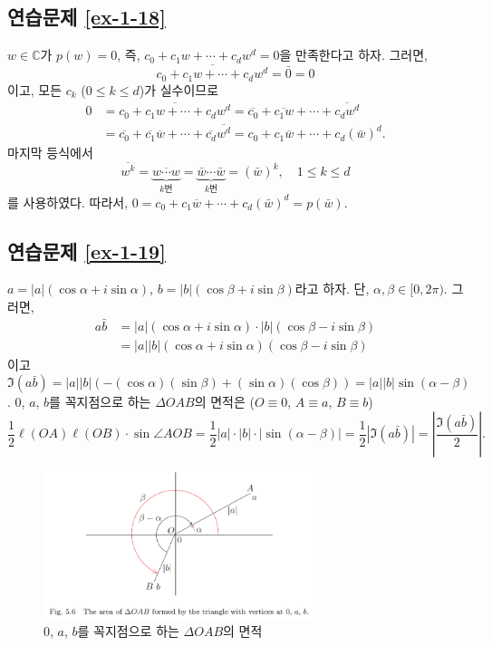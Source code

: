\subsection*{연습문제 \ref{ex-1-18}}

$w\in\mathbb C$가 $p(w)=0$, 즉,
$c_0 + c_1w + \cdots + c_dw^d=0$을 만족한다고 하자. 
그러면,
\[
\overline{c_0 + c_1w + \cdots + c_dw^d} = \bar 0 = 0
\]
이고, 모든 $c_k$ ($0\le k\le d$)가 실수이므로
\begin{align*}
0 & = \overline{c_0 + c_1w + \cdots + c_dw^d} 
= \overline{c_0} + \overline{c_1w} + \cdots + \overline{c_dw^d} \\
&= \overline{c_0} + \overline{c_1}\overline{w} + \cdots + \overline{c_d}\overline{w^d}
= c_0 + c_1\overline{w} + \cdots + c_d(\bar w)^d.
\end{align*}
마지막 등식에서 
\[
\overline{w^k} = \underbrace{\overline{w\cdots w}}_{k\text{번}}
= \underbrace{\bar w \cdots \bar w}_{k\text{번}}
= (\bar w)^k,
\quad 1\le k \le d
\]
를 사용하였다.
따라서, $0=c_0 + c_1\overline{w} + \cdots + c_d(\bar w)^d = p(\bar w)$.

\subsection*{연습문제 \ref{ex-1-19}}

$a = |a|(\cos\alpha + i\sin\alpha)$, 
$b = |b|(\cos\beta + i\sin \beta)$라고 하자.
단, $\alpha, \beta \in [0,2\pi)$. 그러면,
\begin{align*}
a\bar b &= |a|(\cos\alpha + i\sin\alpha)\cdot
|b|(\cos\beta - i\sin \beta) \\
&=|a||b|(\cos\alpha + i\sin\alpha)(\cos\beta - i\sin \beta)
\end{align*}
이고 $\Im(a\bar b) = |a||b|(-(\cos\alpha)(\sin\beta) + (\sin\alpha)(\cos\beta))
= |a||b|\sin(\alpha-\beta)$.
$0$, $a$, $b$를 꼭지점으로 하는 $\Delta OAB$의 면적은
($O\equiv 0$, $A\equiv a$, $B\equiv b$)
\[
\dfrac12 \ell(OA)\ell(OB) \cdot \sin \angle AOB
= \dfrac12 |a|\cdot |b| \cdot |\sin(\alpha-\beta)|
= \dfrac12 |\Im(a\bar b)| = \left| \dfrac{\Im(a\bar b)}2\right|.
\]

\begin{figure}[h!]
\begin{center}
\includegraphics[width=0.7\textwidth]{./figs/fig-5-6}
\end{center}
\caption{$0$, $a$, $b$를 꼭지점으로 하는 $\Delta OAB$의 면적}
\label{fig-5-6}
\end{figure}

